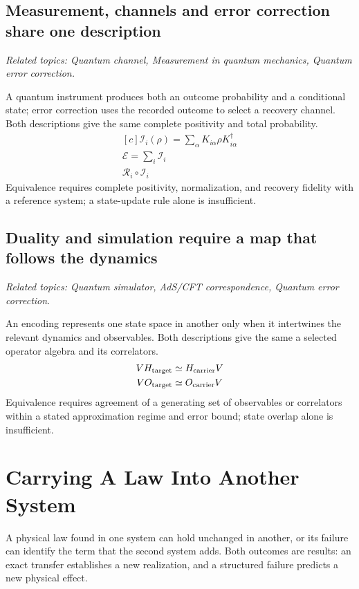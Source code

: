 \documentclass[11pt,oneside]{book}
\newenvironment{centeredalign}{\[\begin{gathered}[c]}{\end{gathered}\]}
\begin{document}
\section{Measurement, channels and error correction share one description}
\par\noindent\textit{Related topics: Quantum channel, Measurement in quantum mechanics, Quantum error correction.}\par
A quantum instrument produces both an outcome probability and a conditional state; error correction uses the recorded outcome to select a recovery channel. Both descriptions give the same complete positivity and total probability.
\begin{centeredalign}
\mathcal I_i(\rho)=\sum_\alpha K_{i\alpha}\rho K_{i\alpha}^\dagger\\
\mathcal E=\sum_i\mathcal I_i\\
\mathcal R_i\circ\mathcal I_i
\end{centeredalign}
Equivalence requires complete positivity, normalization, and recovery fidelity with a reference system; a state-update rule alone is insufficient.
\section{Duality and simulation require a map that follows the dynamics}
\par\noindent\textit{Related topics: Quantum simulator, AdS/CFT correspondence, Quantum error correction.}\par
An encoding represents one state space in another only when it intertwines the relevant dynamics and observables. Both descriptions give the same a selected operator algebra and its correlators.
\begin{centeredalign}
VH_{\rm target}\simeq H_{\rm carrier}V\\
VO_{\rm target}\simeq O_{\rm carrier}V
\end{centeredalign}
Equivalence requires agreement of a generating set of observables or correlators within a stated approximation regime and error bound; state overlap alone is insufficient.


\chapter{Carrying A Law Into Another System}\label{chap:transfer}
\begin{claimbox}
A physical law found in one system can hold unchanged in another, or its failure can identify the term that the second
system adds. Both outcomes are results: an exact transfer establishes a new realization, and a structured failure
predicts a new physical effect.
\end{claimbox}
\end{document}
